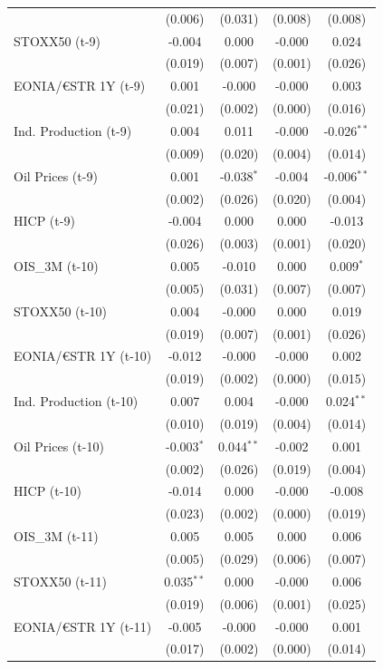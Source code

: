 \begin{longtable}[t]{lcccc}
 & (0.006) & (0.031) & (0.008) & (0.008)\\
STOXX50 (t-9) & -0.004 & 0.000 & -0.000 & 0.024\\
 & (0.019) & (0.007) & (0.001) & \vphantom{1} (0.026)\\
EONIA/€STR 1Y (t-9) & 0.001 & -0.000 & -0.000 & 0.003\\
 & (0.021) & (0.002) & (0.000) & (0.016)\\
Ind. Production (t-9) & 0.004 & 0.011 & -0.000 & -0.026$^{**}$\\
 & (0.009) & (0.020) & (0.004) & (0.014)\\
Oil Prices (t-9) & 0.001 & -0.038$^{*}$ & -0.004 & -0.006$^{**}$\\
 & (0.002) & (0.026) & (0.020) & (0.004)\\
HICP (t-9) & -0.004 & 0.000 & 0.000 & -0.013\\
 & (0.026) & (0.003) & (0.001) & (0.020)\\
OIS\_3M (t-10) & 0.005 & -0.010 & 0.000 & 0.009$^{*}$\\
 & (0.005) & (0.031) & (0.007) & (0.007)\\
STOXX50 (t-10) & 0.004 & -0.000 & 0.000 & 0.019\\
 & (0.019) & (0.007) & (0.001) & (0.026)\\
EONIA/€STR 1Y (t-10) & -0.012 & -0.000 & -0.000 & 0.002\\
 & (0.019) & (0.002) & (0.000) & \vphantom{1} (0.015)\\
Ind. Production (t-10) & 0.007 & 0.004 & -0.000 & 0.024$^{**}$\\
 & (0.010) & (0.019) & (0.004) & (0.014)\\
Oil Prices (t-10) & -0.003$^{*}$ & 0.044$^{**}$ & -0.002 & 0.001\\
 & (0.002) & (0.026) & (0.019) & (0.004)\\
HICP (t-10) & -0.014 & 0.000 & -0.000 & -0.008\\
 & (0.023) & (0.002) & (0.000) & (0.019)\\
OIS\_3M (t-11) & 0.005 & 0.005 & 0.000 & 0.006\\
 & (0.005) & (0.029) & (0.006) & (0.007)\\
STOXX50 (t-11) & 0.035$^{**}$ & 0.000 & -0.000 & 0.006\\
 & (0.019) & (0.006) & (0.001) & (0.025)\\
EONIA/€STR 1Y (t-11) & -0.005 & -0.000 & -0.000 & 0.001\\
 & (0.017) & (0.002) & (0.000) & (0.014)\\

\end{longtable}
